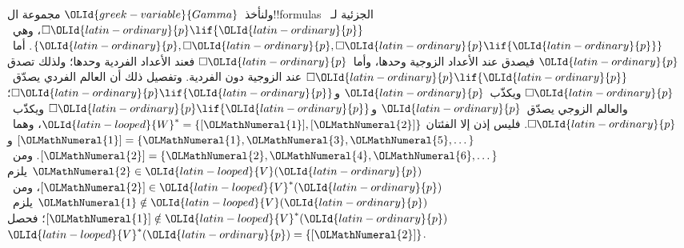 \documentclass[../../../include/open-logic-section]{subfiles}
\begin{document}
\begin{ex}
  ولنأخذ~${\OLId{greek-variable}{Gamma}}$ مجموعة ال!!{formula}s الجزئية لـ~$\Box {\OLId{latin-ordinary}{p}} \lif {\OLId{latin-ordinary}{p}}$،
  وهي~$\{{\OLId{latin-ordinary}{p}},\Box {\OLId{latin-ordinary}{p}},\Box {\OLId{latin-ordinary}{p}} \lif {\OLId{latin-ordinary}{p}}\}$. أما~${\OLId{latin-ordinary}{p}}$ فيصدق عند الأعداد الزوجية
  وحدها، وأما~$\Box {\OLId{latin-ordinary}{p}}$ فعند الأعداد الفردية وحدها؛ ولذلك تصدق
  $\Box {\OLId{latin-ordinary}{p}} \lif {\OLId{latin-ordinary}{p}}$ عند الزوجية دون الفردية. وتفصيل ذلك أن العالم الفردي
  يصدّق~$\Box {\OLId{latin-ordinary}{p}}$ ويكذّب~${\OLId{latin-ordinary}{p}}$ و$\Box {\OLId{latin-ordinary}{p}} \lif {\OLId{latin-ordinary}{p}}$؛ والعالم الزوجي
  يصدّق~${\OLId{latin-ordinary}{p}}$ و$\Box {\OLId{latin-ordinary}{p}} \lif {\OLId{latin-ordinary}{p}}$ ويكذّب~$\Box {\OLId{latin-ordinary}{p}}$. فليس إذن إلا الفئتان
  ${\OLId{latin-looped}{W}}^*=\{[{\OLMathNumeral{1}}],[{\OLMathNumeral{2}}]\}$، وهما~$[{\OLMathNumeral{1}}]=\{{\OLMathNumeral{1}},{\OLMathNumeral{3}},{\OLMathNumeral{5}},\dots\}$
  و$[{\OLMathNumeral{2}}]=\{{\OLMathNumeral{2}},{\OLMathNumeral{4}},{\OLMathNumeral{6}},\dots\}$. ومن~${\OLMathNumeral{2}} \in {\OLId{latin-looped}{V}}({\OLId{latin-ordinary}{p}})$ يلزم
  $[{\OLMathNumeral{2}}] \in {\OLId{latin-looped}{V}}^*({\OLId{latin-ordinary}{p}})$، ومن~${\OLMathNumeral{1}} \notin {\OLId{latin-looped}{V}}({\OLId{latin-ordinary}{p}})$ يلزم~$[{\OLMathNumeral{1}}] \notin {\OLId{latin-looped}{V}}^*({\OLId{latin-ordinary}{p}})$؛
  فحصل~${\OLId{latin-looped}{V}}^*({\OLId{latin-ordinary}{p}})=\{[{\OLMathNumeral{2}}]\}$.


\end{ex}
\end{document}
